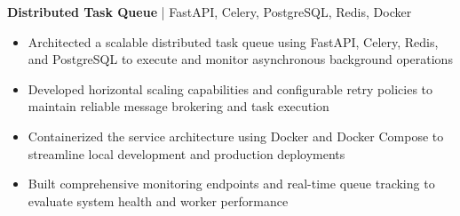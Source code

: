\textbf{Distributed Task Queue} | FastAPI, Celery, PostgreSQL, Redis, Docker \\
\vspace{-9pt}
\begin{itemize}
  \item Architected a scalable distributed task queue using FastAPI, Celery, Redis, and PostgreSQL to execute and monitor asynchronous background operations
  \item Developed horizontal scaling capabilities and configurable retry policies to maintain reliable message brokering and task execution
  \item Containerized the service architecture using Docker and Docker Compose to streamline local development and production deployments
  \item Built comprehensive monitoring endpoints and real-time queue tracking to evaluate system health and worker performance
\end{itemize}

\vspace{-18.5pt}